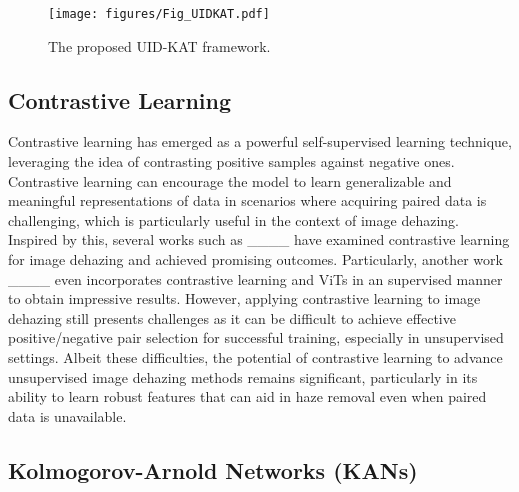 \begin{figure*}
    \centering
    \texttt{[image: figures/Fig\_UIDKAT.pdf]}
    \caption{The proposed UID-KAT framework.}
    \label{fig:framework} 
\end{figure*}


\subsection{Contrastive Learning}
\label{subsec:contrastivelearning}

Contrastive learning has emerged as a powerful self-supervised learning technique, leveraging the idea of contrasting positive samples against negative ones. Contrastive learning can encourage the model to learn generalizable and meaningful representations of data in scenarios where acquiring paired data is challenging, which is particularly useful in the context of image dehazing. Inspired by this, several works such as ____ have examined contrastive learning for image dehazing and achieved promising outcomes. Particularly, another work ____ even incorporates contrastive learning and ViTs in an supervised manner to obtain impressive results. However, applying contrastive learning to image dehazing still presents challenges as it can be difficult to achieve effective positive/negative pair selection for successful training, especially in unsupervised settings. Albeit these difficulties, the potential of contrastive learning to advance unsupervised image dehazing methods remains significant, particularly in its ability to learn robust features that can aid in haze removal even when paired data is unavailable.


\subsection{Kolmogorov-Arnold Networks (KANs)}
\label{subsec:kan}

